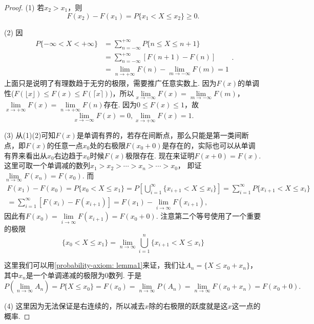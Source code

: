 \documentclass{article}
\begin{document}
\begin{proof}
\rm  
{\color{red}(1)} 若$x_2 > x_1$，则
$$
F(x_2)-F(x_1) = P\{x_1 < X \leq x_2\} \geq 0.
$$ 

{\color{red}(2)} 因
$$
\begin{array}{ll}
P\{-\infty < X < +\infty\} &= \sum\limits_{n=-\infty}^{+\infty}P\{n \leq X \leq n+1\} \\ 
&= \sum\limits_{n=-\infty}^{+\infty}\left[F(n+1)-F(n)\right]\\
&= \lim\limits_{n \rightarrow +\infty}F(n) - \lim\limits_{m \to -\infty} F(m)= 1 
\end{array}.
$$
上面只是说明了有理数趋于无穷的极限，需要推广任意实数上. 因为$F(x)$的单调性($ F(\lfloor x \rfloor) \leq F(x) \leq F(\lceil x \rceil)$)，所以$\lim\limits_{x \rightarrow -\infty}F(x) = \lim\limits_{m \to -\infty} F(m)$，$\lim\limits_{x \rightarrow +\infty}F(x)= \lim\limits_{n \rightarrow +\infty}F(n)$存在. 因为$0\leq F(x) \leq 1$，故
$$
\lim\limits_{x \rightarrow -\infty}F(x) =0 , \lim\limits_{x \rightarrow +\infty}F(x)=1.
$$


{\color{red}(3)} 从(1)(2)可知$F(x)$是单调有界的，若存在间断点，那么只能是第一类间断点，即$F(x)$的任意一点$x_0$处的右极限$F(x_0+0)$是存在的，实际也可以从单调有界来看出从$x_0$右边趋于$x_0$时候$F(x)$极限存在. 现在来证明$F(x+0) = F(x)$. 这里可取一个单调减的数列$x_1 > x_2 > \cdots > x_n > \cdots> x_0$， 即证$\lim\limits_{n \rightarrow \infty} F(x_n) = F(x_0)$. 而
$$
\begin{array}{ll}
F(x_1) - F(x_0) =  P\{x_0 < X \leq x_1\} =  P\left[\bigcup\limits_{i=1}^\infty\{x_{i+1} < X \leq x_{i}\}\right] = \sum\limits_{i=1}^\infty P\{x_{i+1} < X \leq x_i\} \\
= \sum\limits_{i=1}^\infty \left[F(x_i) - F(x_{i+1})\right] =  F(x_1) - \lim\limits_{i \to \infty} F(x_{i+1}),
\end{array}
$$
因此有$F(x_0) = \lim\limits_{i \to \infty} F(x_{i+1}) = F(x_0+0)$. 注意第二个等号使用了一个重要的极限
$$
\{x_0 < X \leq x_1\} = \lim\limits_{n \rightarrow \infty}\bigcup\limits_{i=1}^n\{x_{i+1} < X \leq x_{i}\}
$$

这里我们可以用\ref{probability-axiom: lemma1}来证，我们让$A_n = \{X \leq x_0 + x_n\}$，其中$x_n$是一个单调递减的极限为$0$数列. 于是
$$
P(\lim\limits_{n \to \infty}A_n) = P\{X \leq x_0\} =  F(x_0) = \lim\limits_{n \to \infty} P(A_n) = \lim\limits_{n\to \infty}F(x_0+x_n) = F(x_0 + 0). 
$$

{\color{red}(4)} 这里因为无法保证是右连续的，所以减去$x$除的右极限的跃度就是这$x$这一点的概率.
\end{proof}
\end{document}
